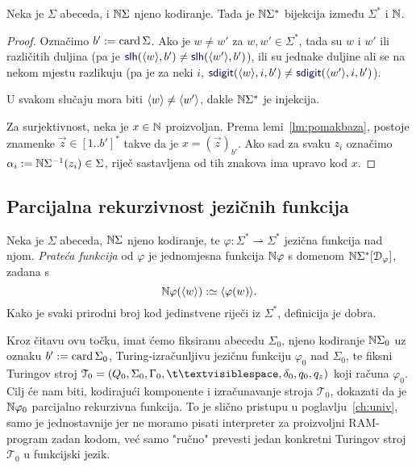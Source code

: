\begin{propozicija}[{name=[bijektivnost kodiranja riječi]}]\label{pp:bijkr}
Neka je $\Sigma$ abeceda, i ${\mathbb N}\Sigma$ njeno kodiranje. Tada je ${\mathbb N}\Sigma^*$ bijekcija između $\Sigma^*$ i ${\mathbb N}$.
\end{propozicija}
\begin{proof}
Označimo $b':=\operatorname{card}\Sigma$. Ako je $w\not=w'$ za $w,w'\in\Sigma^*$, tada su $w$ i $w'$ ili različitih duljina (pa je $\f{slh}(\kr w,b')\not=\f{slh}(\kr{w'},b')$), ili su jednake duljine ali se na nekom mjestu razlikuju (pa je za neki $i$, $\f{sdigit}(\kr w,i,b')\not=\f{sdigit}(\kr{w'},i,b')$).

U svakom slučaju mora biti $\langle w\rangle\not=\langle w'\rangle$, dakle ${\mathbb N}\Sigma^*$ je injekcija.

Za surjektivnost, neka je $x\in{\mathbb N}$ proizvoljan. Prema lemi~\ref{lm:pomakbaza}, postoje znamenke $\vec z\in[1..b']^*$ takve da je $x=(\vec z)_{b'}$. Ako sad za svaku $z_i$ označimo $\alpha_i:={\mathbb N}\Sigma^{-1}(z_i)\in\Sigma$, riječ sastavljena od tih znakova ima upravo kod $x$.
\end{proof}

\subsection{Parcijalna rekurzivnost jezičnih funkcija}\label{sec:tikp}


\begin{definicija}[{name=[prateća funkcija jezične funkcije]}]\label{def:kodfi}
Neka je $\Sigma$ abeceda, ${\mathbb N}\Sigma$ njeno kodiranje, te $\varphi\colon\Sigma^*\rightharpoonup\Sigma^*$ jezična funkcija nad njom. \emph{Prateća funkcija} od $\varphi$ je jednomjesna funkcija ${\mathbb N}\varphi$ s domenom ${\mathbb N}\Sigma^*[\mathcal D_{\varphi}]$, zadana s
\begin{equation}\label{eq:kodfidef}
    {\mathbb N}\varphi(\langle w\rangle):\simeq\langle\varphi(w)\rangle\text.
\end{equation}
Kako je svaki prirodni broj kod jedinstvene riječi iz $\Sigma^*$, definicija je dobra.
\end{definicija}

Kroz čitavu ovu točku, imat ćemo fiksiranu abecedu $\Sigma_0$, njeno kodiranje ${\mathbb N}\Sigma_0$ uz oznaku $b':=\operatorname{card}\Sigma_0$, Turing-izračunljivu jezičnu funkciju $\varphi_0$ nad $\Sigma_0$, te fiksni Turingov stroj $\mathcal T_0=(Q_0,\Sigma_0,\Gamma_0,\bl,\delta_0,q_0,q_z)$ koji računa $\varphi_0$. Cilj će nam biti, kodirajući komponente i izračunavanje stroja $\mathcal T_0$, dokazati da je ${\mathbb N}\varphi_0$ parcijalno rekurzivna funkcija. To je slično pristupu u poglavlju~\ref{ch:univ}, samo je jednostavnije jer ne moramo pisati interpreter za proizvoljni RAM-program zadan kodom, već samo "ručno" prevesti jedan konkretni Turingov stroj $\mathcal T_0$ u funkcijski jezik.

